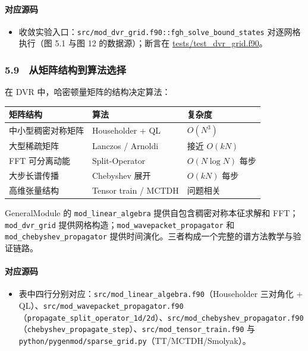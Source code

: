 \documentclass[
]{ctexbook}
\providecommand{\tightlist}{%
  \setlength{\itemsep}{0pt}\setlength{\parskip}{0pt}}
\begin{document}
\hypertarget{ux5bf9ux5e94ux6e90ux7801-12}{%
\paragraph{对应源码}\label{ux5bf9ux5e94ux6e90ux7801-12}}

\begin{itemize}
\tightlist
\item
  收敛实验入口：\texttt{src/mod\_dvr\_grid.f90::fgh\_solve\_bound\_states}
  对逐网格执行（图 5.1 与图 12 的数据源）；断言在
  \href{https://github.com/l1Ha/QuantumGeneralModule/blob/main/tests/test_dvr_grid.f90}{tests/test\_dvr\_grid.f90}。
\end{itemize}

\hypertarget{ux4eceux77e9ux9635ux7ed3ux6784ux5230ux7b97ux6cd5ux9009ux62e9}{%
\subsubsection{5.9　从矩阵结构到算法选择}\label{ux4eceux77e9ux9635ux7ed3ux6784ux5230ux7b97ux6cd5ux9009ux62e9}}

在 DVR 中，哈密顿量矩阵的结构决定算法：

\begin{longtable}[]{@{}lll@{}}
\toprule
矩阵结构 & 算法 & 复杂度\tabularnewline
\midrule
\endhead
中小型稠密对称矩阵 & Householder + QL & \(O(N^3)\)\tabularnewline
大型稀疏矩阵 & Lanczos / Arnoldi & 接近 \(O(kN)\)\tabularnewline
FFT 可分离动能 & Split-Operator & \(O(N\log N)\) 每步\tabularnewline
大步长谱传播 & Chebyshev 展开 & \(O(kN)\) 每步\tabularnewline
高维张量结构 & Tensor train / MCTDH & 问题相关\tabularnewline
\bottomrule
\end{longtable}

GeneralModule 的 \texttt{mod\_linear\_algebra}
提供自包含稠密对称本征求解和 FFT；\texttt{mod\_dvr\_grid}
提供网格构造；\texttt{mod\_wavepacket\_propagator} 和
\texttt{mod\_chebyshev\_propagator}
提供时间演化。三者构成一个完整的谱方法教学与验证链路。

\hypertarget{ux5bf9ux5e94ux6e90ux7801-13}{%
\paragraph{对应源码}\label{ux5bf9ux5e94ux6e90ux7801-13}}

\begin{itemize}
\tightlist
\item
  表中四行分别对应：\texttt{src/mod\_linear\_algebra.f90}（Householder
  三对角化 +
  QL）、\texttt{src/mod\_wavepacket\_propagator.f90}（\texttt{propagate\_split\_operator\_1d/2d}）、\texttt{src/mod\_chebyshev\_propagator.f90}（\texttt{chebyshev\_propagate\_step}）、\texttt{src/mod\_tensor\_train.f90}
  与 \texttt{python/pygenmod/sparse\_grid.py}（TT/MCTDH/Smolyak）。
\end{itemize}
\end{document}
